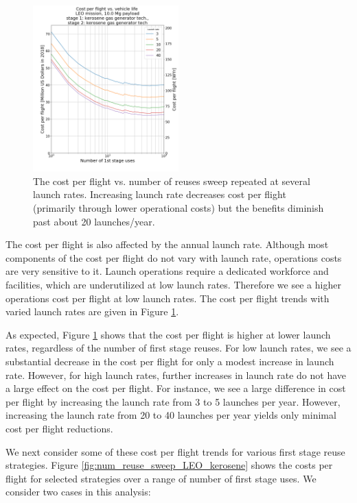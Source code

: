 \documentclass[conf]{new-aiaa}
\begin{document}
\begin{multicols}{2}
\begin{figure}[H]
    \centering
    \includegraphics[width=0.5\textwidth]{../../lvreuse/analysis/combined/plots/cpf_reuses_sweep_vary_launch_rate}
    \caption{\label{fig:cpf_reuses_sweep_vary_launch_rate} The cost per flight vs. number of reuses sweep repeated at several launch rates. Increasing launch rate decreases cost per flight (primarily through lower operational costs) but the benefits diminish past about 20 launches/year.}
\end{figure}

The cost per flight is also affected by the annual launch rate. Although most components of the cost per flight do not vary with launch rate, operations costs are very sensitive to it. Launch operations require a dedicated workforce and facilities, which are underutilized at low launch rates. Therefore we see a higher operations cost per flight at low launch rates. The cost per flight trends with varied launch rates are given in Figure \ref{fig:cpf_reuses_sweep_vary_launch_rate}. 

As expected, Figure \ref{fig:cpf_reuses_sweep_vary_launch_rate} shows that the cost per flight is higher at lower launch rates, regardless of the number of first stage reuses. For low launch rates, we see a substantial decrease in the cost per flight for only a modest increase in launch rate. However, for high launch rates, further increases in launch rate do not have a large effect on the cost per flight. For instance, we see a large difference in cost per flight by increasing the launch rate from 3 to 5 launches per year. However, increasing the launch rate from 20 to 40 launches per year yields only minimal cost per flight reductions. 

We next consider some of these cost per flight trends for various first stage reuse strategies. Figure \ref{fig:num_reuse_sweep_LEO_kerosene} shows the costs per flight for selected strategies over a range of number of first stage uses. We consider two cases in this analysis: 


\end{multicols}
\end{document}
